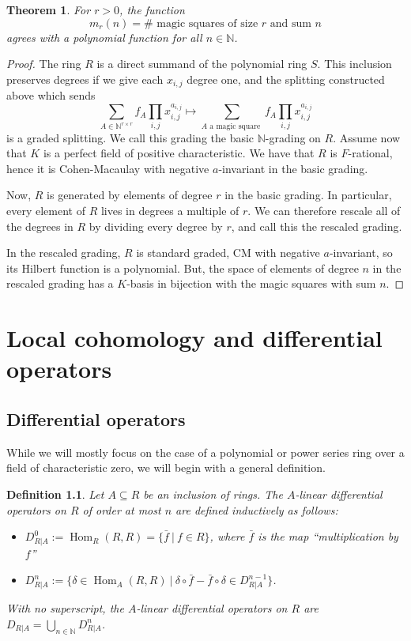 \documentclass[11pt]{book}
\newtheorem{theorem}{Theorem}[chapter]
\newtheorem{definition}[theorem]{Definition}
\numberwithin{equation}{section}
\numberwithin{theorem}{chapter}
\theoremstyle{definition}
\newtheorem*{basic properties}{Basic Properties}
\newtheorem*{Important Remark}{Important Remark}
\theoremstyle{remark}
\newcommand{\NN}{\mathbb{N}}
\newcommand{\Hom}{\operatorname{Hom}}
\begin{document}
\begin{theorem} For $r>0$, the function 
	\[m_r(n)=\# \text{ magic squares of size $r$ and sum $n$}\]
	agrees with a polynomial function for all $n\in \NN$.
	\end{theorem}
\begin{proof}
	The ring $R$ is a direct summand of the polynomial ring $S$. This inclusion preserves degrees if we give each $x_{i,j}$ degree one, and the splitting constructed above which sends 
	\[\sum_{A \in \NN^{r\times r}}{f_A  \prod_{i,j} x_{i,j}^{a_{i,j}}} \mapsto \sum_{A \text{ a magic square }}{f_A  \prod_{i,j} x_{i,j}^{a_{i,j}}}\]
	is a graded splitting. We call this grading the basic $\NN$-grading on $R$. Assume now that $K$ is a perfect field of positive characteristic. We have that $R$ is $F$-rational, hence it is Cohen-Macaulay with negative $a$-invariant in the basic grading.
	
	Now, $R$ is generated by elements of degree $r$ in the basic grading. In particular, every element of $R$ lives in degrees a multiple of $r$. We can therefore rescale all of the degrees in $R$ by dividing every degree by $r$, and call this the rescaled grading.
	
	In the rescaled grading, $R$ is standard graded, CM with negative $a$-invariant, so its Hilbert function is a polynomial. But, the space of elements of degree $n$ in the rescaled grading has a $K$-basis in bijection with the magic squares with sum $n$.
\end{proof}




\chapter{Local cohomology and differential operators}

\section{Differential operators}

While we will mostly focus on the case of a polynomial or power series ring over a field of characteristic zero, we will begin with a general definition.

\begin{definition}
	Let $A\subseteq R$ be an inclusion of rings. The \emph{$A$-linear differential operators on $R$ of order at most $n$} are defined inductively as follows:
	\begin{itemize}
		\item $D^0_{R|A}:=\Hom_R(R,R)=\{ \bar{f} \ | \ f\in R\}$, where $\bar{f}$ is the map ``multiplication by $f$''
		\item $D^n_{R|A}:=\{ \delta \in \Hom_A(R,R) \ | \ \delta \circ \bar{f} - \bar{f} \circ \delta \in D^{n-1}_{R|A} \}$.
	\end{itemize}
With no superscript, the \emph{$A$-linear differential operators on $R$} are $D_{R|A}=\bigcup_{n\in \NN} D^n_{R|A}$.
\end{definition}
\end{document}
